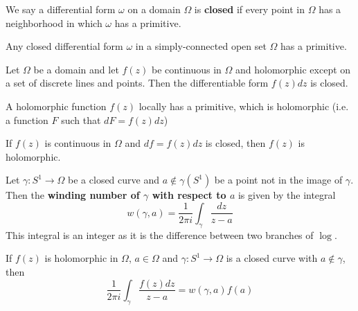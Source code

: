 \documentclass{article}
\begin{document}
\begin{definition}
  We say a differential form \(\omega\) on a domain \(\Omega\) is \textbf{closed} if every point in \(\Omega\) has a neighborhood in which \(\omega\) has a primitive.
\end{definition}

\begin{theorem}
  Any closed differential form \(\omega\) in a simply-connected open set \(\Omega\) has a primitive.
\end{theorem}

\begin{theorem}
  Let \(\Omega\) be a domain and let \(f(z)\) be continuous in \(\Omega\) and holomorphic except on a set of discrete lines and points. Then the differentiable form \(f(z)dz\) is closed.
\end{theorem}

\begin{corollary}
  A holomorphic function \(f(z)\) locally has a primitive, which is holomorphic (i.e. a function \(F\) such that \(dF = f(z)dz\))
\end{corollary}

\begin{corollary}
  If \(f(z)\) is continuous in \(\Omega\) and \(df = f(z)dz\) is closed, then \(f(z)\) is holomorphic.
\end{corollary}

\begin{definition}
  Let \(\gamma: S^1 \to \Omega\) be a closed curve and \(a \notin \gamma(S^1)\) be a point not in the image of \(\gamma\). Then the \textbf{winding number of \(\gamma\) with respect to \(a\)} is given by the integral
  \begin{equation}
    w(\gamma, a) = \frac{1}{2\pi i}\int_\gamma\frac{dz}{z - a}
  \end{equation}
  This integral is an integer as it is the difference between two branches of \(\log\).
\end{definition}

\begin{theorem}
  If \(f(z)\) is holomorphic in \(\Omega\), \(a \in \Omega\) and \(\gamma: S^1 \to \Omega\) is a closed curve with \(a \notin \gamma\), then
  \begin{equation}
    \frac{1}{2\pi i}\int_\gamma\frac{f(z)dz}{z - a} = w(\gamma, a)f(a)
  \end{equation}
\end{theorem}
\end{document}
